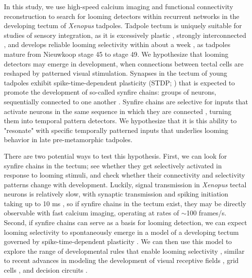 \documentclass{article}
\begin{document}
In this study, we use high-speed calcium imaging and functional connectivity reconstruction to search for looming detectors within recurrent networks in the developing tectum of \textit{Xenopus} tadpoles. Tadpole tectum is uniquely suitable for studies of sensory integration, as it is excessively plastic \citep{pratt2007intrinsic, busch2019}, strongly interconnected \citep{james2015}, and develops reliable looming selectivity within about a week \citep{dong2009, khakhalin2014}, as tadpoles mature from Nieuwkoop stage 45 to stage 49. We hypothesize that looming detectors may emerge in development, when connections between tectal cells are reshaped by patterned visual stimulation. Synapses in the tectum of young tadpoles exhibit spike-time-dependent plasticity (STDP; \citealt{zhang1998stdp, mu2006stdp, vislay2006rf, richards2010stdp}) that is expected to promote the development of so-called synfire chains: groups of neurons, sequentially connected to one another \citep{fiete2010chains, zheng2014synfire}. Synfire chains are selective for inputs that activate neurons in the same sequence in which they are connected \citep{clopath2010stdpcoding}, turning them into temporal pattern detectors. We hypothesize that it is this ability to "resonate" with specific temporally patterned inputs that underlies looming behavior in late pre-metamorphic tadpoles. 

There are two potential ways to test this hypothesis. First, we can look for synfire chains in the tectum; see whether they get selectively activated in response to looming stimuli, and check whether their connectivity and selectivity patterns change with development. Luckily, signal transmission in \textit{Xenopus} tectal neurons is relatively slow, with synaptic transmission and spiking initiation taking up to 10 ms \citep{ciarleglio2015, jang2016, busch2019}, so if synfire chains in the tectum exist, they may be directly observable with fast calcium imaging, operating at rates of $\sim$100 frames/s. Second, if synfire chains can serve as a basis for looming detection, we can expect looming selectivity to spontaneously emerge in a model of a developing tectum governed by spike-time-dependent plasticity \citep{gao2015simplicity, pietri2017emergence}. We can then use this model to explore the range of developmental rules that enable looming selectivity \citep{linderman2017constrain, bassett2018models}, similar to recent advances in modeling the development of visual receptive fields \citep{bashivan2018neural}, grid cells \citep{banino2018grid}, and decision circuits \citep{haesemeyer2018convergent}. 
\end{document}
